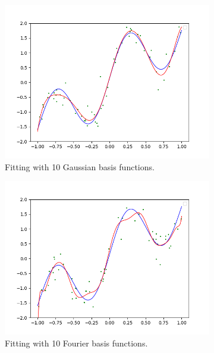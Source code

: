 \documentclass{article}
\theoremstyle{definition}
\begin{document}
    \begin{figure}[hbt!]
        \centering
        \begin{subfigure}[b]{0.48\textwidth}
        \centering
            \includegraphics[width=\textwidth]{img/Gaussian_Fit.png}
            \caption{Fitting with 10 Gaussian basis functions. }
            \label{fig:gaussian_basis}
        \end{subfigure}
        \hfill 
        \begin{subfigure}[b]{0.48\textwidth}
        \centering
            \includegraphics[width=\textwidth]{img/Fourier_Fit.png}
            \caption{Fitting with 10 Fourier basis functions. }
            \label{fig:fourier_basis}
        \end{subfigure}
        \caption{}
        \label{Coincide_mean}
    \end{figure}
\end{document}
